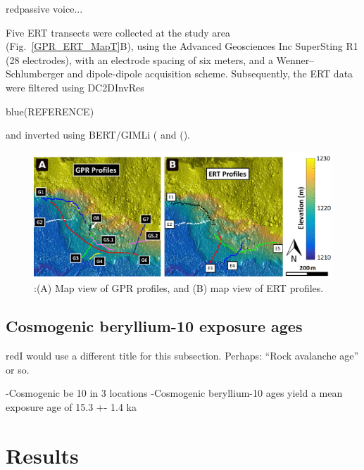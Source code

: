 \documentclass[5p]{elsarticle}
\newcommand{\COMON}{\begin{color}{blue}}
\newcommand{\COMOFF}{\end{color}}
\newcommand{\alon}{\begin{color}{red}}
\newcommand{\aloff}{\end{color}}
\begin{document}
\alon passive voice... \aloff
Five ERT transects were collected at the study area (Fig.~\ref{GPR_ERT_MapT}B), using the Advanced Geosciences Inc SuperSting R1 (28 electrodes), with an electrode spacing of six meters, and a Wenner–Schlumberger and dipole-dipole acquisition scheme. Subsequently, the ERT data were filtered using DC2DInvRes \COMON (REFERENCE) \COMOFF and inverted using BERT/GIMLi (\cite{gunther2006three} and (\cite{Ruecker2017}).


								 \begin{figure}[h]

	\includegraphics[width=\textwidth]{Figures/GPR_ERT_Map.pdf}
		\caption{:(A) Map view of GPR profiles, and (B) map view of ERT profiles. \label{GPR_ERT_Map}}

								   \end{figure}



\subsection{Cosmogenic beryllium-10 exposure ages}
\alon I would use a different title for this subsection. Perhaps:
``Rock avalanche age'' or so. \aloff

-Cosmogenic be 10 in 3 locations
-Cosmogenic beryllium-10 ages yield a mean exposure age of 15.3 +- 1.4 ka


\bigskip  

 
\section{Results}
\end{document}
